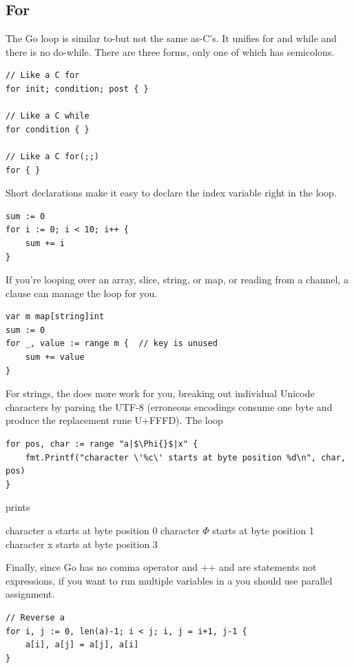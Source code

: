 \subsection{For}
The Go  loop is similar to-but not the same as-C's. It unifies for
and while and there is no do-while. There are three forms, only one of
which has semicolons.
\begin{lstlisting}
// Like a C for
for init; condition; post { }

// Like a C while
for condition { }

// Like a C for(;;)
for { }
\end{lstlisting}
Short declarations make it easy to declare the index variable right in the loop.
\begin{lstlisting}
sum := 0
for i := 0; i < 10; i++ {
    sum += i
}
\end{lstlisting}
If you're looping over an array, slice, string, or map, or reading from
a channel, a  clause can manage the loop for you.
\begin{lstlisting}
var m map[string]int
sum := 0
for _, value := range m {  // key is unused
    sum += value
}
\end{lstlisting}
For strings, the  does more work for you, breaking out individual
Unicode characters by parsing the UTF-8 (erroneous encodings consume one
byte and produce the replacement rune U+FFFD). The loop

\begin{lstlisting}
for pos, char := range "a|$\Phi{}$|x" {
    fmt.Printf("character \'%c\' starts at byte position %d\n", char, pos)
}
\end{lstlisting}
prints
\begin{display}
character a starts at byte position 0
character \begin{math}\Phi\end{math} starts at byte position 1
character x starts at byte position 3
\end{display}
Finally, since Go has no comma operator and ++ and \-\- are statements not
expressions, if you want to run multiple variables in a  you should
use parallel assignment.
\begin{lstlisting}
// Reverse a
for i, j := 0, len(a)-1; i < j; i, j = i+1, j-1 {
    a[i], a[j] = a[j], a[i]
}
\end{lstlisting}

